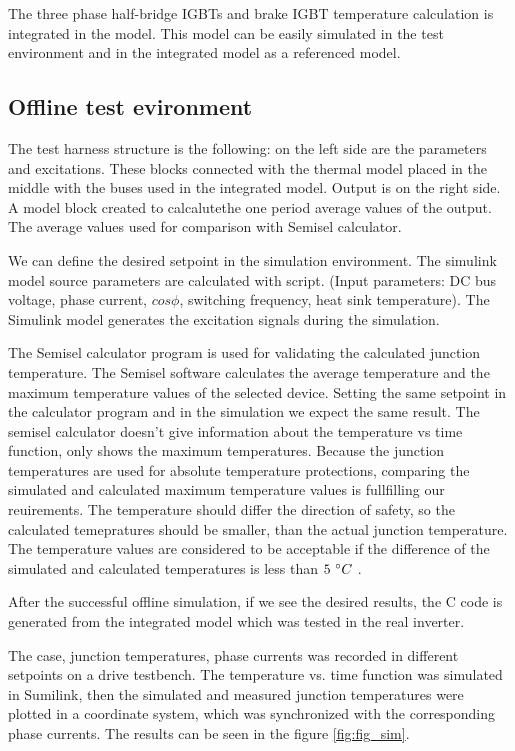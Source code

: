 The three phase half-bridge IGBTs and brake IGBT temperature calculation is integrated in the model. This model can be easily simulated in the test environment and in the integrated model as a referenced model.

\subsection{Offline test evironment}

The test harness structure is the following: on the left side are the parameters and excitations. These blocks connected with the thermal model placed in the middle with the buses used in the integrated model. Output is on the right side. A model block created to calcalutethe one period average values of the output. The average values used for comparison with Semisel calculator.

We can define the desired setpoint in the simulation environment. The simulink model source parameters are calculated with script. (Input parameters: DC bus voltage, phase current, $cos\phi{}$, switching frequency, heat sink temperature). The Simulink model generates the excitation signals during the simulation.

The Semisel calculator program is used for validating the calculated junction temperature. The Semisel software calculates the average temperature and the maximum temperature values of the selected device. Setting the same setpoint in the calculator program and in the simulation we expect the same result. The  semisel calculator doesn’t give information about the temperature vs time function, only shows the maximum temperatures. Because the junction temperatures are used for absolute temperature protections, comparing the simulated and calculated maximum temperature values is fullfilling our reuirements. The temperature should differ the direction of safety, so the calculated temepratures should be smaller, than the actual junction temperature. The temperature values are considered to be acceptable if the difference of the simulated and calculated temperatures is less than $5\ \degree{}C$ .

After the successful offline simulation, if we see the desired results, the C code is generated from the integrated model which was tested in the real inverter.

The case, junction temperatures, phase currents was recorded in different setpoints on a drive testbench. The temperature vs. time function was simulated in Sumilink, then the simulated and measured junction temperatures were  plotted in a coordinate system, which was synchronized with the corresponding phase currents. The results can be seen in the figure \ref{fig:fig_sim}.

